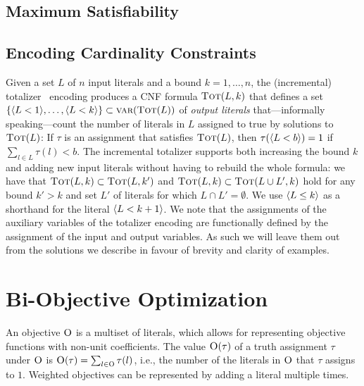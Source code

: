 \subsection{Maximum Satisfiability\label{sec:max-sat}}

\subsection{Encoding Cardinality Constraints\label{sec:card-const}}

Given a set $L$ of $n$ input literals and a bound $k=1, \ldots, n$, the (incremental) totalizer~\autocite{DBLP:conf/cp/BailleuxB03,DBLP:conf/cp/MartinsJML14} encoding produces a CNF formula $\textsc{Tot}(L, k)$ that defines a set $\{\langle L < 1 \rangle, \ldots, \langle L < k \rangle\} \subset \textsc{var}(\textsc{Tot}(L))$ of \emph{output literals} that---informally speaking---count the number of literals in $L$ assigned to true by solutions to $\textsc{Tot}(L)$: If $\tau$ is an assignment that satisfies $\textsc{Tot}(L)$, then $\tau(\langle L < b \rangle) = 1$ if $\sum_{l \in L} \tau(l) < b$.
The incremental totalizer supports both increasing the bound $k$ and adding new input literals without having to rebuild the whole formula: we have that $\textsc{Tot}(L, k) \subset \textsc{Tot}(L, k')$ and $\textsc{Tot}(L, k) \subset  \textsc{Tot}(L \cup L', k)$ hold for any bound $k' > k$ and set $L'$ of literals for which $L \cap L' =  \emptyset$. 
We use $\langle L \leq k \rangle$ as a shorthand for the literal $\langle L < k+1 \rangle$.
We note that the assignments of the auxiliary variables of the totalizer encoding are functionally defined by the assignment of the input and output variables.
As such we will leave them out from the solutions we describe in favour of brevity and clarity of examples. 

\section{Bi-Objective Optimization\label{sec:biopt}}


An objective $\textsc{O}$ is a multiset of literals, which allows for representing objective functions with non-unit coefficients.
The value $\textsc{O}(\tau)$ of a truth assignment $\tau$ under $\textsc{O}$ is $\textsc{O}(\tau) = \sum_{l \in \textsc{O}} \tau(l)$, i.e., the number of the literals in $\textsc{O}$ that $\tau$ assigns to $1$. 
Weighted objectives can be represented by adding a literal multiple times.


